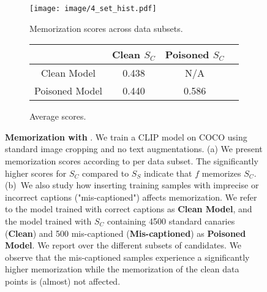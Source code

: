 \begin{figure}[t]
    \centering
    \begin{subfigure}[b]{0.45\textwidth}
        \centering
        \texttt{[image: image/4\_set\_hist.pdf]} %
        \caption{Memorization scores across data subsets.}
        \label{fig:memorization_subsets}
    \end{subfigure}
    \begin{subfigure}[b]{0.45\textwidth}
        \centering
        \tiny
        \begin{tabular}{cccc}
\toprule
 &  Clean $S_C$ & Poisoned $S_C$ \\
\midrule
Clean Model &  0.438 & N/A\\
Poisoned Model &  0.440 & 0.586\\
\bottomrule
\end{tabular}    %
    \caption{\vspace{3em}Average \ours scores.}
    \label{tab:memorization_poisoning}
    \end{subfigure}
    \caption{\textbf{Memorization with \ours}. We train a CLIP model on COCO using standard image cropping and no text augmentations. (a) We present memorization scores according to \ours per data subset. The significantly higher scores for $S_C$ compared to $S_S$ indicate that $f$ memorizes $S_C$. (b)~We also study how inserting training samples with imprecise or incorrect captions ("mis-captioned") affects memorization. We refer to the model trained with correct captions as \textbf{Clean Model}, and the model trained with $S_C$ containing 4500 standard canaries (\textbf{Clean}) and 500 mis-captioned (\textbf{Mis-captioned}) as \textbf{Poisoned Model}.    
    We report \ours over the different subsets of candidates. We observe that the mis-captioned samples experience a significantly higher memorization while the memorization of the clean data points is (almost) not affected.}

\end{figure}

